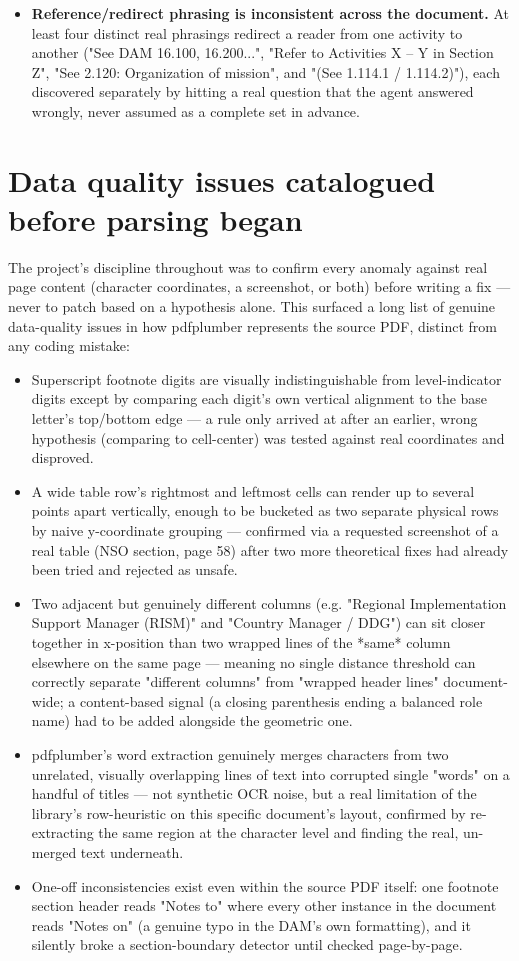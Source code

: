 \begin{itemize}
\item \textbf{Reference/redirect phrasing is inconsistent across the document.} At least four distinct real phrasings redirect a reader from one activity to another ("See DAM 16.100, 16.200...", "Refer to Activities X – Y in Section Z", "See 2.120: Organization of mission", and "(See 1.114.1 / 1.114.2)"), each discovered separately by hitting a real question that the agent answered wrongly, never assumed as a complete set in advance.
\end{itemize}
\section{Data quality issues catalogued before parsing began}
The project's discipline throughout was to confirm every anomaly against real page content (character coordinates, a screenshot, or both) before writing a fix — never to patch based on a hypothesis alone. This surfaced a long list of genuine data-quality issues in how pdfplumber represents the source PDF, distinct from any coding mistake:

\begin{itemize}
\item Superscript footnote digits are visually indistinguishable from level-indicator digits except by comparing each digit's own vertical alignment to the base letter's top/bottom edge — a rule only arrived at after an earlier, wrong hypothesis (comparing to cell-center) was tested against real coordinates and disproved.
\item A wide table row's rightmost and leftmost cells can render up to several points apart vertically, enough to be bucketed as two separate physical rows by naive y-coordinate grouping — confirmed via a requested screenshot of a real table (NSO section, page 58) after two more theoretical fixes had already been tried and rejected as unsafe.
\item Two adjacent but genuinely different columns (e.g. "Regional Implementation Support Manager (RISM)" and "Country Manager / DDG") can sit closer together in x-position than two wrapped lines of the *same* column elsewhere on the same page — meaning no single distance threshold can correctly separate "different columns" from "wrapped header lines" document-wide; a content-based signal (a closing parenthesis ending a balanced role name) had to be added alongside the geometric one.
\item pdfplumber's word extraction genuinely merges characters from two unrelated, visually overlapping lines of text into corrupted single "words" on a handful of titles — not synthetic OCR noise, but a real limitation of the library's row-heuristic on this specific document's layout, confirmed by re-extracting the same region at the character level and finding the real, un-merged text underneath.
\item One-off inconsistencies exist even within the source PDF itself: one footnote section header reads "Notes to" where every other instance in the document reads "Notes on" (a genuine typo in the DAM's own formatting), and it silently broke a section-boundary detector until checked page-by-page.
\end{itemize}
